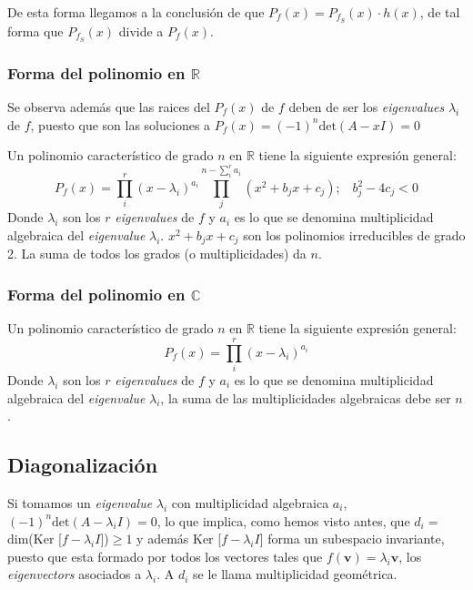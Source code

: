 \documentclass{preset}
\begin{document}
De esta forma llegamos a la conclusión de que $P_f(x)=P_{f_S}(x) \cdot h(x)$, de tal forma que $P_{f_S}(x)$ divide a $P_f(x)$.

\vspace{-15pt}
\subsubsection{Forma del polinomio en $\mathbb{R}$}

Se observa además que las raices del $P_f(x)$ de $f$ deben de ser los \textit{eigenvalues} $\lambda_i$ de $f$, puesto que son las soluciones a $P_f(x)=(-1)^n \mbox{det}(A-xI)=0$

Un polinomio característico de grado $n$ en $\mathbb{R}$ tiene la siguiente expresión general:
\[P_f(x)=\prod^r_i{(x-\lambda_i)^{a_i}} \prod^{n - \sum_i^r{a_i}}_j {(x^2 + b_j x + c_j)}; \;\;\; b_j^2 -4 c_j < 0\]
Donde $\lambda_i$ son los $r$ \textit{eigenvalues} de $f$ y $a_i$ es lo que se denomina multiplicidad algebraica del \textit{eigenvalue} $\lambda_i$. $ x^2 + b_j x + c_j$ son los polinomios irreducibles de grado 2. La suma de todos los grados (o multiplicidades) da $n$.

\vspace{-15pt}
\subsubsection{Forma del polinomio en $\mathbb{C}$}

Un polinomio característico de grado $n$ en $\mathbb{R}$ tiene la siguiente expresión general:
\[P_f(x)=\prod^r_i{(x-\lambda_i)^{a_i}}\]
Donde $\lambda_i$ son los $r$ \textit{eigenvalues} de $f$ y $a_i$ es lo que se denomina multiplicidad algebraica del \textit{eigenvalue} $\lambda_i$, la suma de las multiplicidades algebraicas debe ser $n$.

\vspace{-15pt}
\subsection{Diagonalización}

Si tomamos un \textit{eigenvalue} $	\lambda_i$ con multiplicidad algebraica $a_i$, $(-1)^n \mbox{det}(A-\lambda_i I)=0$, lo que implica, como hemos visto antes, que $d_i = $ dim(Ker [$f-\lambda_i I$])$\geq 1$ y además Ker [$f-\lambda_i I$] forma un subespacio invariante, puesto que esta formado por todos los vectores tales que $f(\textbf{v})=\lambda_i \textbf{v}$, los \textit{eigenvectors} asociados a $\lambda_i$. A $d_i$ se le llama multiplicidad geométrica.
\end{document}

